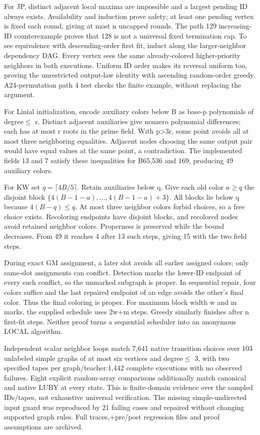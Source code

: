 \documentclass[
  11pt,
]{article}
\begin{document}
For JP, distinct adjacent local maxima are impossible and a largest
pending ID always exists. Availability and induction prove safety; at
least one pending vertex is fixed each round, giving at most n uncapped
rounds. The path 129 increasing-ID counterexample proves that 128 is not
a universal fixed termination cap. To see equivalence with
descending-order first fit, induct along the larger-neighbor dependency
DAG. Every vertex sees the same already-colored higher-priority
neighbors in both executions. Uniform ID order makes its reversal
uniform too, proving the unrestricted output-law identity with ascending
random-order greedy. A24-permutation path 4 test checks the finite
example, without replacing the argument.

For Linial initialization, encode auxiliary colors below B as base-p
polynomials of degree\(\le\) r. Distinct adjacent auxiliaries give
nonzero polynomial differences; each has at most r roots in the prime
field. With p\textgreater3r, some point avoids all at most three
neighboring equalities. Adjacent nodes choosing the same output pair
would have equal values at the same point, a contradiction. The
implemented fields 13 and 7 satisfy these inequalities for B65,536 and
169, producing 49 auxiliary colors.

For KW set \(q=\lceil4B/5\rceil\). Retain auxiliaries below q. Give each
old color \(a\ge q\) the disjoint block
\(\{4(B-1-a),\ldots,4(B-1-a)+3\}\). All blocks lie below q because
\(4(B-q)\le q\). At most three neighbor colors forbid choices, so a free
choice exists. Recoloring endpoints have disjoint blocks, and recolored
nodes avoid retained neighbor colors. Properness is preserved while the
bound decreases. From 49 it reaches 4 after 13 such steps, giving 15
with the two field steps.

During exact GM assignment, a later slot avoids all earlier assigned
colors; only same-slot assignments can conflict. Detection marks the
lower-ID endpoint of every such conflict, so the unmarked subgraph is
proper. In sequential repair, four colors suffice and the last repaired
endpoint of an edge avoids the other's final color. Thus the final
coloring is proper. For maximum block width w and m marks, the supplied
schedule uses 2w+m steps. Greedy similarly finishes after n first-fit
steps. Neither proof turns a sequential scheduler into an anonymous
LOCAL algorithm.

Independent scalar neighbor loops match 7,641 native transition choices
over 103 unlabeled simple graphs of at most six vertices and
degree\(\le\) 3, with two specified tapes per graph/teacher:1,442
complete executions with no observed failures. Eight explicit
random-array comparisons additionally match canonical and native LUBY at
every state. This is finite-domain evidence over the sampled IDs/tapes,
not exhaustive universal verification. The missing simple-undirected
input guard was reproduced by 21 failing cases and repaired without
changing supported graph rules. Full traces,+pre/post regression files
and proof assumptions are archived.
\end{document}
